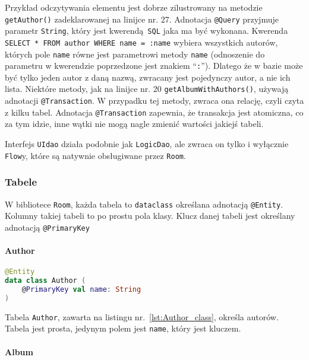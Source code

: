 Przykład odczytywania elementu jest dobrze zilustrowany na metodzie \texttt{getAuthor()} zadeklarowanej na linijce nr. 27. Adnotacja \texttt{@Query} przyjmuje parametr \texttt{String}, który jest kwerendą \texttt{SQL} jaka ma być wykonana. Kwerenda \texttt{SELECT * FROM author WHERE name = :name} wybiera wszystkich autorów, których pole \texttt{name} równe jest parametrowi metody \texttt{name} (odnoszenie do parametru w kwerendzie poprzedzone jest znakiem \enquote{\texttt{:}}). Dlatego że w bazie może być tylko jeden autor z daną nazwą, zwracany jest pojedynczy autor, a nie ich lista. Niektóre metody, jak na linijce nr. 20 \texttt{getAlbumWithAuthors()}, używają adnotacji \texttt{@Transaction}. W przypadku tej metody, zwraca ona relację, czyli czyta z kilku tabel. Adnotacja \texttt{@Transaction} zapewnia, że transakcja jest atomiczna, co za tym idzie, inne wątki nie mogą nagle zmienić wartości jakiejś tabeli.

Interfejs \texttt{UIdao} działa podobnie jak \texttt{LogicDao}, ale zwraca on tylko i wyłącznie \texttt{Flow}y, które są natywnie obsługiwane przez \texttt{Room}.

\subsubsection{Tabele} \label{sec:tables}

W bibliotece \texttt{Room}, każda tabela to \texttt{dataclass} określana adnotacją \texttt{@Entity}. Kolumny takiej tabeli to po prostu pola klasy. Klucz danej tabeli jest określany adnotacją \texttt{@PrimaryKey}

\paragraph{Author}

\begin{lstlisting}[caption=Deklaracja tabeli Author, label={lst:Author_class}, language=kotlin]
@Entity
data class Author (
    @PrimaryKey val name: String
)
\end{lstlisting}

Tabela \texttt{Author}, zawarta na listingu nr.~\ref{lst:Author_class}, określa autorów. Tabela jest prosta, jedynym polem jest \texttt{name}, który jest kluczem.

\paragraph{Album}

